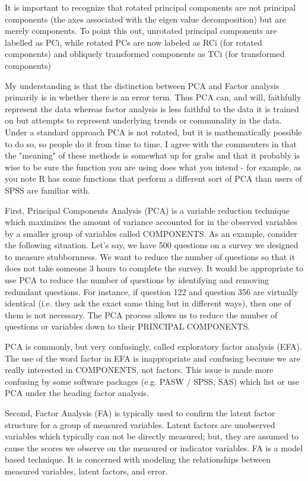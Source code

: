 It is important to recognize that rotated principal components are not principal components (the axes associated with the eigen value decomposition) but are merely components. To point this out, unrotated principal components are labelled as PCi, while rotated PCs are now labeled as RCi (for rotated components) and obliquely transformed components as TCi (for transformed components)

My understanding is that the distinction between PCA and Factor analysis primarily is in whether there is an error term. Thus PCA can, and will, faithfully represent the data whereas factor analysis is less faithful to the data it is trained on but attempts to represent underlying trends or communality in the data. Under a standard approach PCA is not rotated, but it is mathematically possible to do so, so people do it from time to time. I agree with the commenters in that the "meaning" of these methods is somewhat up for grabs and that it probably is wise to be sure the function you are using does what you intend - for example, as you note R has some functions that perform a different sort of PCA than users of SPSS are familiar with.

 First, Principal Components Analysis (PCA) is a variable reduction technique which 
 maximizes the amount of variance accounted for in the observed variables by a 
 smaller group of variables called COMPONENTS. As an example, consider the 
 following situation. Let's say, we have 500 questions on a survey we designed 
 to measure stubbornness. We want to reduce the number of questions so that it 
 does not take someone 3 hours to complete the survey. It would be appropriate to 
 use PCA to reduce the number of questions by identifying and removing redundant 
 questions. For instance, if question 122 and question 356 are virtually identical 
 (i.e. they ask the exact same thing but in different ways), then one of them is 
 not necessary. The PCA process allows us to reduce the number of questions or 
 variables down to their PRINCIPAL COMPONENTS.

 PCA is commonly, but very confusingly, called exploratory factor analysis (EFA). 
 The use of the word factor in EFA is inappropriate and confusing because we are 
 really interested in COMPONENTS, not factors. This issue is made more confusing 
 by some software packages (e.g. PASW / SPSS, SAS) which list or use PCA under the 
 heading factor analysis.

 Second, Factor Analysis (FA) is typically used to confirm the latent factor 
 structure for a group of measured variables. Latent factors are unobserved 
 variables which typically can not be directly measured; but, they are assumed to 
 cause the scores we observe on the measured or indicator variables. FA is a model 
 based technique. It is concerned with modeling the relationships between measured 
 variables, latent factors, and error.

